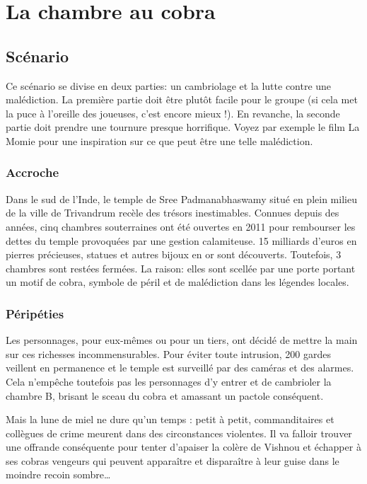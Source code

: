 \chapter{La chambre au cobra}

\section{Scénario}

Ce scénario se divise en deux parties: un cambriolage et la lutte contre une malédiction.
La première partie doit être plutôt facile pour le groupe (si cela met la puce à l'oreille des joueuses, c'est encore mieux !).
En revanche, la seconde partie doit prendre une tournure presque horrifique.
Voyez par exemple le film La Momie pour une inspiration sur ce que peut être une telle malédiction.

\subsection{Accroche}

Dans le sud de l'Inde, le temple de Sree Padmanabhaswamy situé en plein milieu de la ville de Trivandrum recèle des trésors inestimables.
Connues depuis des années, cinq chambres souterraines ont été ouvertes en 2011 pour rembourser les dettes du temple provoquées par une gestion calamiteuse.
15 milliards d'euros en pierres précieuses, statues et autres bijoux en or sont découverts.
Toutefois, 3 chambres sont restées fermées.
La raison: elles sont scellée par une porte portant un motif de cobra, symbole de péril et de malédiction dans les légendes locales.

\subsection{Péripéties}

Les personnages, pour eux-mêmes ou pour un tiers, ont décidé de mettre la main sur ces richesses incommensurables.
Pour éviter toute intrusion, 200 gardes veillent en permanence et le temple est surveillé par des caméras et des alarmes.
Cela n'empêche toutefois pas les personnages d'y entrer et de cambrioler la chambre B, brisant le sceau du cobra et amassant un pactole conséquent.

Mais la lune de miel ne dure qu'un temps : petit à petit, commanditaires et collègues de crime meurent dans des circonstances violentes.
Il va falloir trouver une offrande conséquente pour tenter d'apaiser la colère de Vishnou et échapper à ses cobras vengeurs qui peuvent apparaître et disparaître à leur guise dans le moindre recoin sombre\dots

